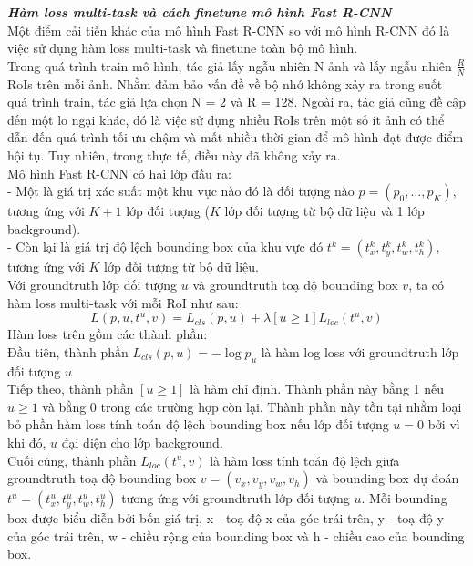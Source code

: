 {    \noindent
    \textbf{\textit{Hàm loss multi-task và cách finetune mô hình Fast R-CNN}} \\
    Một điểm cải tiến khác của mô hình Fast R-CNN so với mô hình R-CNN đó là việc sử dụng hàm loss multi-task và finetune toàn bộ mô hình. \\
    Trong quá trình train mô hình, tác giả lấy ngẫu nhiên N ảnh và lấy ngẫu nhiên $\frac{R}{N}$ RoIs trên mỗi ảnh.
    Nhằm đảm bảo vấn đề về bộ nhớ không xảy ra trong suốt quá trình train, tác giả lựa chọn N = 2 và R = 128.
    Ngoài ra, tác giả cũng đề cập đến một lo ngại khác, đó là việc sử dụng nhiều RoIs trên một số ít ảnh có thể dẫn đến quá trình tối ưu chậm và mất nhiều thời gian để mô hình đạt được điểm hội tụ.
    Tuy nhiên, trong thực tế, điều này đã không xảy ra. \\
    Mô hình Fast R-CNN có hai lớp đầu ra: \\
    - Một là giá trị xác suất một khu vực nào đó là đối tượng nào $p = (p_0, \dots, p_K)$, tương ứng với $K + 1$ lớp đối tượng ($K$ lớp đối tượng từ bộ dữ liệu và 1 lớp background). \\
    - Còn lại là giá trị độ lệch bounding box của khu vực đó $t^{k} = (t^{k}_{x}, t^{k}_{y}, t^{k}_{w}, t^{k}_{h})$, tương ứng với $K$ lớp đối tượng từ bộ dữ liệu. \\
    Với groundtruth lớp đối tượng $u$ và groundtruth toạ độ bounding box $v$, ta có hàm loss multi-task với mỗi RoI như sau:
    \begin{equation}
        \label{eq:fast_rcnn_loss}
        L(p, u, t^u, v) = L_{cls}(p, u) + \lambda [u \ge 1] L_{loc}(t^u, v)
    \end{equation}
    Hàm loss trên gồm các thành phần: \\
    Đầu tiên, thành phần $L_{cls}(p, u) = -\log p_u$ là hàm log loss với groundtruth lớp đối tượng $u$ \\
    Tiếp theo, thành phần $[u \ge 1]$ là hàm chỉ định. Thành phần này bằng 1 nếu $u \ge 1$ và bằng 0 trong các trường hợp còn lại. Thành phần này tồn tại nhằm loại bỏ phần hàm loss tính toán độ lệch bounding box nếu lớp đối tượng $u = 0$ bởi vì khi đó, $u$ đại diện cho lớp background. \\
    Cuối cùng, thành phần $L_{loc}(t^u, v)$ là hàm loss tính toán độ lệch giữa groundtruth toạ độ bounding box $v = (v_{x}, v_{y}, v_{w}, v_{h})$ và bounding box dự đoán $t^u = (t^u_{x}, t^u_{y}, t^u_{w}, t^u_{h})$ tương ứng với groundtruth lớp đối tượng $u$. Mỗi bounding box được biểu diễn bởi bốn giá trị, x - toạ độ x của góc trái trên, y - toạ độ y của góc trái trên, w - chiều rộng của bounding box và h - chiều cao của bounding box.
}
